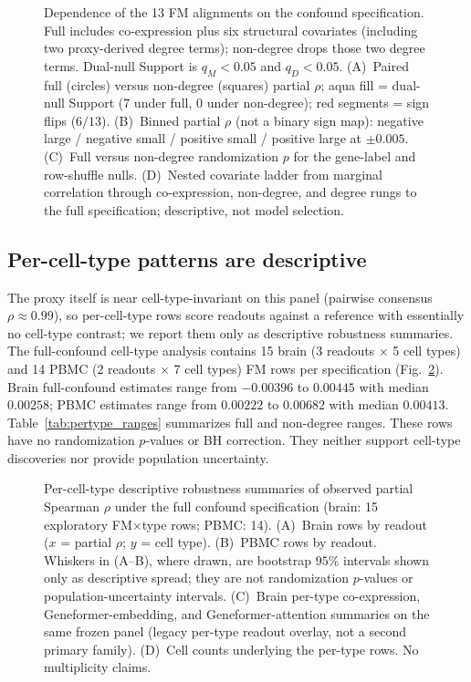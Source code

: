 \documentclass[fleqn,10pt,lineno]{wlpeerj}
\newcommand{\fitfig}[1]{\resizebox{\ifdim\width>\linewidth\linewidth\else\width\fi}{!}{#1}}
\begin{document}
\begin{figure}[!tbp]\centering
\fitfig{}
\caption{Dependence of the 13 FM alignments on the confound specification. Full includes
co-expression plus six structural covariates (including two proxy-derived degree terms);
non-degree drops those two degree terms. Dual-null Support is $q_M<0.05$ and $q_D<0.05$.
(A)~Paired full (circles) versus non-degree (squares) partial $\rho$; aqua fill = dual-null
Support ($7$ under full, $0$ under non-degree); red segments = sign flips ($6/13$). (B)~Binned
partial $\rho$ (not a binary sign map): negative large / negative small / positive small /
positive large at $\pm0.005$. (C)~Full versus non-degree randomization $p$ for the gene-label
and row-shuffle nulls. (D)~Nested covariate ladder from marginal correlation through
co-expression, non-degree, and degree rungs to the full specification; descriptive, not model
selection.}\label{fig:spec}
\end{figure}

\subsection{Per-cell-type patterns are descriptive}
The proxy itself is near cell-type-invariant on this panel (pairwise consensus $\rho\approx0.99$),
so per-cell-type rows score readouts against a reference with essentially no cell-type contrast;
we report them only as descriptive robustness summaries. The full-confound cell-type analysis
contains 15 brain (3 readouts $\times$ 5 cell types) and 14 PBMC (2 readouts $\times$ 7 cell
types) FM rows per specification
(Fig.~\ref{fig:pertype}). Brain full-confound estimates range from $-0.00396$ to $0.00445$ with
median $0.00258$; PBMC estimates range from $0.00222$ to $0.00682$ with median $0.00413$.
Table~\ref{tab:pertype_ranges} summarizes full and non-degree ranges. These
rows have no randomization $p$-values or BH correction. They neither support cell-type
discoveries nor provide population uncertainty.

\begin{figure}[!tbp]\centering
\fitfig{}
\caption{Per-cell-type descriptive robustness summaries of observed partial Spearman $\rho$ under
the full confound specification (brain: 15 exploratory FM$\times$type rows; PBMC: 14). (A)~Brain
rows by readout ($x$ = partial $\rho$; $y$ = cell type). (B)~PBMC rows by readout. Whiskers in
(A--B), where drawn, are bootstrap $95\%$ intervals shown only as descriptive spread; they are not
randomization $p$-values or population-uncertainty intervals. (C)~Brain per-type co-expression,
Geneformer-embedding, and Geneformer-attention summaries on the same frozen panel (legacy per-type
readout overlay, not a second primary family). (D)~Cell counts underlying the per-type rows. No
multiplicity claims.}\label{fig:pertype}
\end{figure}
\end{document}
